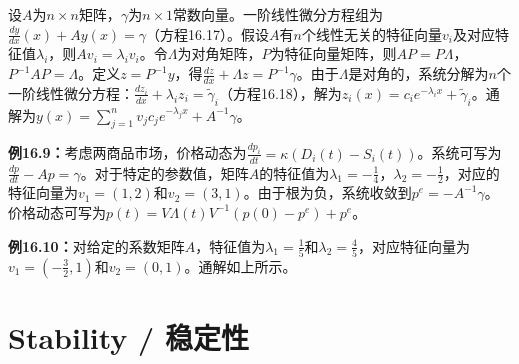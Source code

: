 \begin{translation}
设$A$为$n \times n$矩阵，$\gamma$为$n \times 1$常数向量。一阶线性微分方程组为$\frac{dy}{dx}(x) + A y(x) = \gamma$（方程16.17）。假设$A$有$n$个线性无关的特征向量$v_i$及对应特征值$\lambda_i$，则$A v_i = \lambda_i v_i$。令$\Lambda$为对角矩阵，$P$为特征向量矩阵，则$AP = P\Lambda$，$P^{-1}AP = \Lambda$。定义$z = P^{-1} y$，得$\frac{dz}{dx} + \Lambda z = P^{-1}\gamma$。由于$\Lambda$是对角的，系统分解为$n$个一阶线性微分方程：$\frac{dz_i}{dx} + \lambda_i z_i = \tilde{\gamma}_i$（方程16.18），解为$z_i(x) = c_i e^{-\lambda_i x} + \tilde{\gamma}_i$。通解为$y(x) = \sum_{j=1}^{n} v_j c_j e^{-\lambda_j x} + A^{-1}\gamma$。

\textbf{例16.9：}考虑两商品市场，价格动态为$\frac{d p_i}{dt} = \kappa(D_i(t) - S_i(t))$。系统可写为$\frac{dp}{dt} - Ap = \gamma$。对于特定的参数值，矩阵$A$的特征值为$\lambda_1 = -\frac{1}{4}$，$\lambda_2 = -\frac{1}{2}$，对应的特征向量为$v_1 = (1, 2)$和$v_2 = (3, 1)$。由于根为负，系统收敛到$p^e = -A^{-1}\gamma$。价格动态可写为$p(t) = V \Lambda(t) V^{-1}(p(0) - p^e) + p^e$。

\textbf{例16.10：}对给定的系数矩阵$A$，特征值为$\lambda_1 = \frac{1}{5}$和$\lambda_2 = \frac{4}{5}$，对应特征向量为$v_1 = (-\frac{3}{2}, 1)$和$v_2 = (0, 1)$。通解如上所示。
\end{translation}

\section{Stability / 稳定性}

